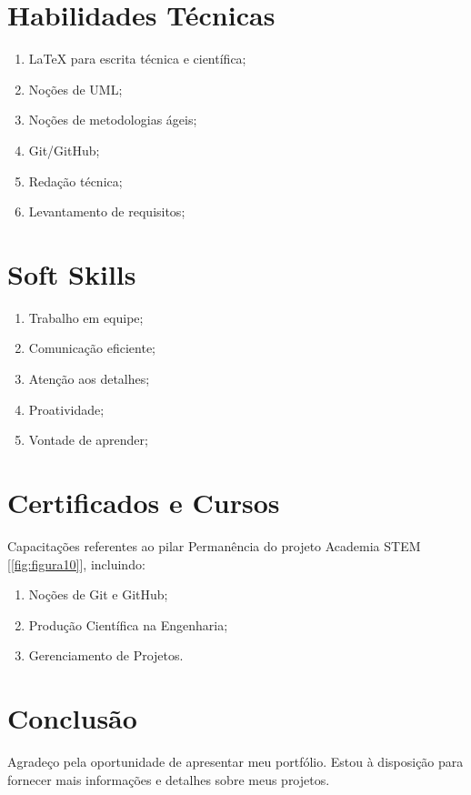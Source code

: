 \documentclass[12pt]{article}
\begin{document}
\section*{Habilidades Técnicas}
\begin{enumerate}
    \item LaTeX para escrita técnica e científica;
    \item Noções de UML;
    \item Noções de metodologias ágeis;
    \item Git/GitHub;
    \item Redação técnica;
    \item Levantamento de requisitos;
\end{enumerate}

\section*{Soft Skills}
\begin{enumerate}
    \item Trabalho em equipe;
    \item Comunicação eficiente;
    \item Atenção aos detalhes;
    \item Proatividade;
    \item Vontade de aprender;
\end{enumerate}

\section*{Certificados e Cursos}
    Capacitações referentes ao pilar Permanência do projeto Academia STEM [\ref{fig:figura10}], incluindo:
    
    \begin{enumerate}
        \item Noções de Git e GitHub;
        \item Produção Científica na Engenharia;
        \item Gerenciamento de Projetos.
    \end{enumerate}

\section*{Conclusão}
    Agradeço pela oportunidade de apresentar meu portfólio. Estou à disposição para fornecer mais informações e detalhes sobre meus projetos.
\end{document}
